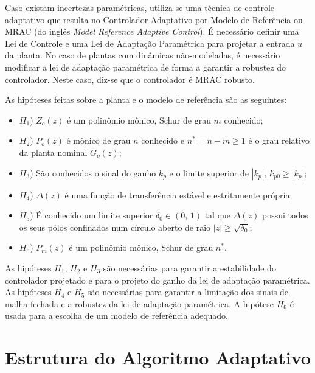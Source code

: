     Caso existam incertezas paramétricas, utiliza-se uma técnica de controle adaptativo
    que resulta no Controlador Adaptativo por Modelo de Referência ou MRAC (do inglês
    \emph{Model Reference Adaptive Control}). É necessário definir uma Lei de Controle
    e uma Lei de Adaptação Paramétrica para projetar a entrada $u$ da planta. No caso de
    plantas com dinâmicas não-modeladas, é necessário modificar a lei de adaptação
    paramétrica de forma a garantir a robustez do controlador. Neste caso, diz-se que o
    controlador é MRAC robusto.

    As hipóteses feitas sobre a planta e o modelo de referência são as seguintes:

    \begin{itemize}
        \item[] $H_1$) $Z_o(z)$ é um polinômio mônico, Schur de grau $m$ conhecido;
        \item[] $H_2$) $P_o(z)$ é mônico de grau $n$ conhecido e $n^* = n - m \geq 1$ é o grau
            relativo da planta nominal $G_o(z)$;
        \item[] $H_3$) São conhecidos o sinal do ganho $k_p$ e o limite superior de $|k_p|$,
            $k_{p0} \geq |k_p|$;
        \item[] $H_4$) $\Delta(z)$ é uma função de transferência estável e estritamente
            própria;
        \item[] $H_5$) É conhecido um limite superior $\delta_0 \in (0, \, 1)$ tal que
            $\Delta(z)$ possui todos os seus pólos confinados num círculo aberto de
            raio $|z| \geq \sqrt{\delta_0}$;
        \item[] $H_6$) $P_m(z)$ é um polinômio mônico, Schur de grau $n^*$.
    \end{itemize}

    As hipóteses $H_1$, $H_2$ e $H_3$ são necessárias para garantir a estabilidade do
    controlador projetado e para o projeto do ganho da lei de adaptação paramétrica.
    As hipóteses $H_4$ e $H_5$ são necessárias para garantir a limitação dos sinais
    de malha fechada e a robustez da lei de adaptação paramétrica. A hipótese $H_6$
    é usada para a escolha de um modelo de referência adequado.

\section{Estrutura do Algoritmo Adaptativo}

